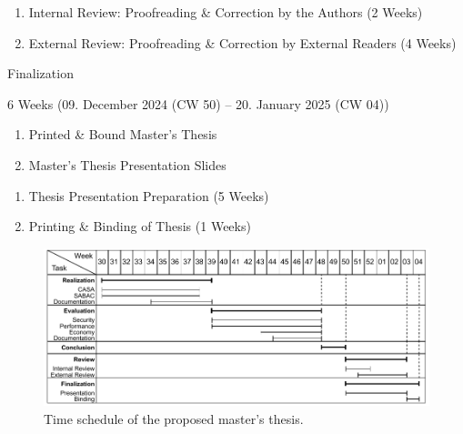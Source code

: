 \begin{description}
\begin{description}[style=multiline, leftmargin=\widthof{\textbf{Deliverables:}}]
        \item[Increments:]
        \begin{enumerate}[label=\arabic*), leftmargin=\widthof{a)}+\labelsep]
            \item Internal Review: Proofreading \& Correction by the Authors (2 Weeks)
            \item External Review: Proofreading \& Correction by External Readers (4 Weeks)
        \end{enumerate}
    \end{description}
    \item[Milestone VI:] Finalization
    \begin{description}[style=multiline, leftmargin=\widthof{\textbf{Deliverables:}}]
        \item[Duration:] 6 Weeks (09. December 2024 (CW 50) -- 20. January 2025 (CW 04))
        \item[Deliverables:]
        \begin{enumerate}[label=\alph*), leftmargin=\widthof{a)}+\labelsep]
            \item Printed \& Bound Master's Thesis
            \item Master's Thesis Presentation Slides
        \end{enumerate}
        \item[Increments:]
        \begin{enumerate}[label=\arabic*), leftmargin=\widthof{a)}+\labelsep]
            \item Thesis Presentation Preparation (5 Weeks)
            \item Printing \& Binding of Thesis (1 Weeks)
        \end{enumerate}
    \end{description}
\end{description}
\begin{figure}
    \centering
    \includegraphics[width=1.0\linewidth]{figures/timeplan.drawio.pdf}
    \caption{Time schedule of the proposed master's thesis.}
    \label{fig:timeplan}
\end{figure}

